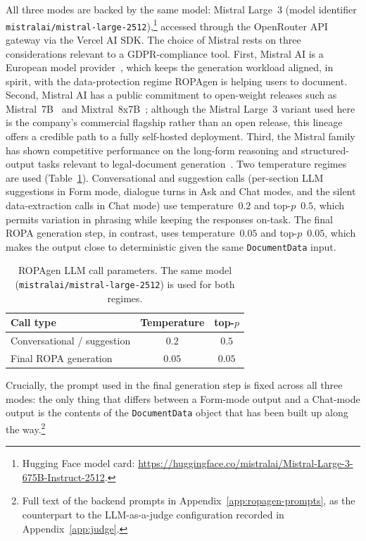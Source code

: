 All three modes are backed by the same model: Mistral Large~3 (model identifier \texttt{mistralai/mistral-large-2512}),\footnote{Hugging Face model card: \url{https://huggingface.co/mistralai/Mistral-Large-3-675B-Instruct-2512}.}
accessed through the OpenRouter API gateway via the Vercel AI SDK.
The choice of Mistral rests on three considerations relevant to a GDPR-compliance tool. First, Mistral AI is a European model provider~\cite{mistralAI},
which keeps the generation workload aligned, in spirit, with the data-protection regime ROPAgen is helping users to document.
Second, Mistral AI has a public commitment to open-weight releases such as Mistral~7B~\cite{Jiang2023Mistral} and Mixtral~8x7B~\cite{Jiang2024Mixtral};
although the Mistral Large~3 variant used here is the company's commercial flagship rather than an open release, this lineage offers a credible path to a fully self-hosted deployment.
Third, the Mistral family has shown competitive performance on the long-form reasoning and structured-output tasks relevant to legal-document generation~\cite{Jiang2023Mistral}.
Two temperature regimes are used (Table~\ref{tab:ropagen-llm-params}). Conversational and suggestion calls (per-section LLM suggestions in Form mode, dialogue turns in Ask and Chat modes,
and the silent data-extraction calls in Chat mode) use temperature~$0.2$ and top-$p$~$0.5$, which permits variation in phrasing while keeping the responses on-task.
The final ROPA generation step, in contrast, uses temperature~$0.05$ and top-$p$~$0.05$, which makes the output close to deterministic given the same \texttt{DocumentData} input.

\begin{table}[htbp]
\centering
\begin{tabular}{@{}l c c@{}}
\toprule
Call type & Temperature & top-$p$ \\
\midrule
Conversational / suggestion & $0.2$  & $0.5$  \\
Final ROPA generation       & $0.05$ & $0.05$ \\
\bottomrule
\end{tabular}
\caption{ROPAgen LLM call parameters. The same model
(\texttt{mistralai/mistral-large-2512}) is used for both regimes.}
\label{tab:ropagen-llm-params}
\end{table} Crucially, the prompt used in the final generation step is fixed across all three modes: the only thing that differs between a Form-mode output and a Chat-mode output is the contents of the \texttt{DocumentData} object that has been built up along the way.\footnote{Full text of the backend prompts in Appendix~\ref{app:ropagen-prompts}, as the counterpart to the LLM-as-a-judge configuration recorded in Appendix~\ref{app:judge}.}

